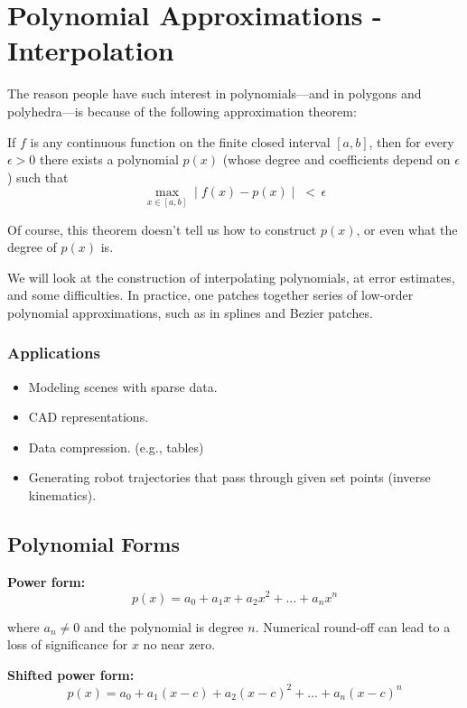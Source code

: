 \chapter{Polynomial Approximations - Interpolation}

The reason people have such interest in polynomials---and in polygons and polyhedra---is because of the following approximation theorem:

\begin{theorem}
If $f$ is any continuous function on the finite closed interval $[a,b]$, then for every $\epsilon>0$ there exists a polynomial $p(x)$ (whose degree and coefficients depend on $\epsilon$) such that 
$$
\max_{x\in [a,b]} \mid f(x) - p(x) \mid \; < \, \epsilon
$$
\end{theorem}

Of course, this theorem doesn't tell us how to construct $p(x)$, or even what the degree of $p(x)$ is. 

We will look at the construction of interpolating polynomials, at error estimates, and some difficulties.
In practice, one patches together series of low-order polynomial approximations, such as in splines and Bezier patches.

\subsection*{Applications}
\begin{itemize}
    \item Modeling scenes with sparse data.
    \item CAD representations.
    \item Data compression. (e.g., tables)
    \item Generating robot trajectories that pass through given set points (inverse kinematics). 
\end{itemize}


\section{Polynomial Forms}

\textbf{Power form:}
$$
p(x) = a_0 + a_1 x + a_2 x^2 + \dots + a_n x^n
$$

where $a_n \neq 0$ and the polynomial is degree $n$. Numerical round-off can lead to a loss of significance for $x$ no near zero. 

\textbf{Shifted power form:}
$$
p(x) = a_0 + a_1 (x-c) + a_2 (x-c)^2 + \dots + a_n(x-c)^n
$$

